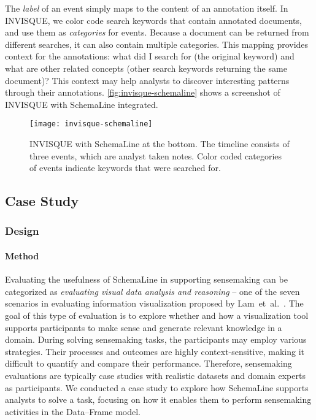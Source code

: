 The \emph{label} of an event simply maps to the content of an annotation itself. In INVISQUE, we color code search keywords that contain annotated documents, and use them as \emph{categories} for events. Because a document can be returned from different searches, it can also contain multiple categories. This mapping provides context for the annotations: what did I search for (the original keyword) and what are other related concepts (other search keywords returning the same document)? This context may help analysts to discover interesting patterns through their annotations. \autoref{fig:invisque-schemaline} shows a screenshot of INVISQUE with SchemaLine integrated.

\begin{figure}[!htb]
	\centering
	\texttt{[image: invisque-schemaline]}
	\caption{INVISQUE with SchemaLine at the bottom. The timeline consists of three events, which are analyst taken notes. Color coded categories of events indicate keywords that were searched for.}
	\label{fig:invisque-schemaline}
\end{figure}

\subsection{Case Study}

\subsubsection{Design}

\paragraph{Method}
Evaluating the usefulness of SchemaLine in supporting sensemaking can be categorized as \emph{evaluating visual data analysis and reasoning} -- one of the seven scenarios in evaluating information visualization proposed by Lam~et~al.~\cite{Lam2012}. The goal of this type of evaluation is to explore whether and how a visualization tool supports participants to make sense and generate relevant knowledge in a domain. During solving sensemaking tasks, the participants may employ various strategies. Their processes and outcomes are highly context-sensitive, making it difficult to quantify and compare their performance. Therefore, sensemaking evaluations are typically case studies with realistic datasets and domain experts as participants. We conducted a case study to explore how SchemaLine supports analysts to solve a task, focusing on how it enables them to perform sensemaking activities in the Data--Frame model.

